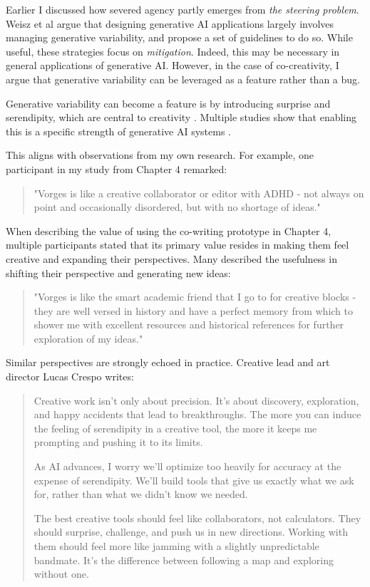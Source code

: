 Earlier I discussed how severed agency partly emerges from \textit{the steering problem}. Weisz et al \cite{Weisz2024-io} argue that designing generative AI applications largely involves managing generative variability, and propose a set of guidelines to do so. While useful, these strategies focus on \textit{mitigation}. Indeed, this may be necessary in general applications of generative AI. However, in the case of co-creativity, I argue that generative variability can be leveraged as a feature rather than a bug.

Generative variability can become a feature is by introducing surprise and serendipity, which are central to creativity \cite{Simon1967-nr, Lubart2001-vl, Grace2015-uc, Moruzzi2022-gp}. Multiple studies show that enabling this is a specific strength of generative AI systems \cite{Lawton2023-tb, Park2024-gw, Koch2020-gx}.

This aligns with observations from my own research. For example, one participant in my study from Chapter 4 remarked:

\begin{quote}
"Vorges is like a creative collaborator or editor with ADHD - not always on point and occasionally disordered, but with no shortage of ideas."
\end{quote}

When describing the value of using the co-writing prototype in Chapter 4, multiple participants stated that its primary value resides in making them feel creative and expanding their perspectives. Many described the usefulness in shifting their perspective and generating new ideas:

\begin{quote}
"Vorges is like the smart academic friend that I go to for creative blocks - they are well versed in history and have a perfect memory from which to shower me with excellent resources and historical references for further exploration of my ideas."
\end{quote}

Similar perspectives are strongly echoed in practice. Creative lead and art director Lucas Crespo writes: 

\begin{quote}
Creative work isn't only about precision. It's about discovery, exploration, and happy accidents that lead to breakthroughs. The more you can induce the feeling of serendipity in a creative tool, the more it keeps me prompting and pushing it to its limits.

As AI advances, I worry we'll optimize too heavily for accuracy at the expense of serendipity. We'll build tools that give us exactly what we ask for, rather than what we didn't know we needed.

The best creative tools should feel like collaborators, not calculators. They should surprise, challenge, and push us in new directions. Working with them should feel more like jamming with a slightly unpredictable bandmate. It’s the difference between following a map and exploring without one. 
\end{quote} \cite{Crespo2025-wr}

